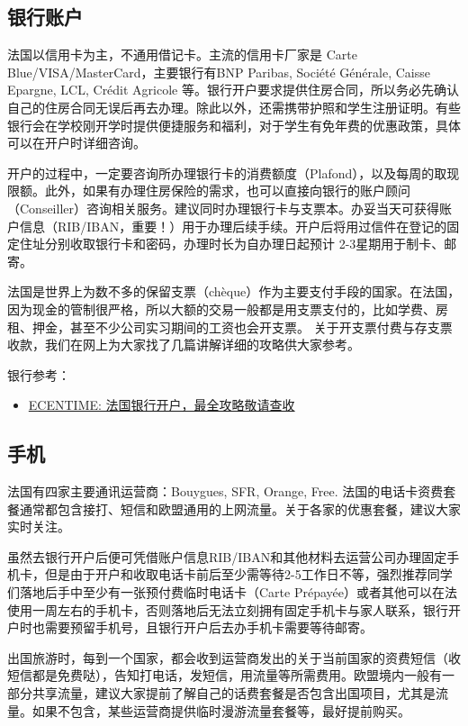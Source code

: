 \documentclass[UTF8]{ctexart}
\begin{document}
\subsection{银行账户}

法国以信用卡为主，不通用借记卡。主流的信用卡厂家是 Carte Blue/VISA/MasterCard，主要银行有BNP Paribas, Société Générale, Caisse Epargne, LCL, Crédit Agricole 等。银行开户要求提供住房合同，所以务必先确认自己的住房合同无误后再去办理。除此以外，还需携带护照和学生注册证明。有些银行会在学校刚开学时提供便捷服务和福利，对于学生有免年费的优惠政策，具体可以在开户时详细咨询。

开户的过程中，一定要咨询所办理银行卡的消费额度（Plafond），以及每周的取现限额。此外，如果有办理住房保险的需求，也可以直接向银行的账户顾问（Conseiller）咨询相关服务。建议同时办理银行卡与支票本。办妥当天可获得账户信息（RIB/IBAN，重要！）用于办理后续手续。开户后将用过信件在登记的固定住址分别收取银行卡和密码，办理时长为自办理日起预计 2-3星期用于制卡、邮寄。

法国是世界上为数不多的保留支票（chèque）作为主要支付手段的国家。在法国，因为现金的管制很严格，所以大额的交易一般都是用支票支付的，比如学费、房租、押金，甚至不少公司实习期间的工资也会开支票。 关于开支票付费与存支票收款，我们在网上为大家找了几篇讲解详细的攻略供大家参考。

银行参考：
\begin{itemize}
    \item \href{https://www.ecentime.com/article/creation-compte-bancaire}{ECENTIME: 法国银行开户，最全攻略敬请查收}
\end{itemize}

\subsection{手机}

法国有四家主要通讯运营商：Bouygues, SFR, Orange, Free. 法国的电话卡资费套餐通常都包含接打、短信和欧盟通用的上网流量。关于各家的优惠套餐，建议大家实时关注。

虽然去银行开户后便可凭借账户信息RIB/IBAN和其他材料去运营公司办理固定手机卡，但是由于开户和收取电话卡前后至少需等待2-5工作日不等，强烈推荐同学们落地后手中至少有一张预付费临时电话卡（Carte Prépayée）或者其他可以在法使用一周左右的手机卡，否则落地后无法立刻拥有固定手机卡与家人联系，银行开户时也需要预留手机号，且银行开户后去办手机卡需要等待邮寄。

出国旅游时，每到一个国家，都会收到运营商发出的关于当前国家的资费短信（收短信都是免费哒），告知打电话，发短信，用流量等所需费用。欧盟境内一般有一部分共享流量，建议大家提前了解自己的话费套餐是否包含出国项目，尤其是流量。如果不包含，某些运营商提供临时漫游流量套餐等，最好提前购买。
\end{document}
